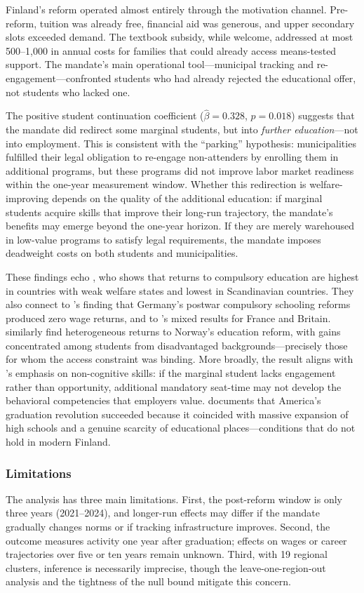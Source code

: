\documentclass[12pt]{article}
\begin{document}
Finland's reform operated almost entirely through the motivation channel. Pre-reform, tuition was already free, financial aid was generous, and upper secondary slots exceeded demand. The textbook subsidy, while welcome, addressed at most \texteuro{}500--1,000 in annual costs for families that could already access means-tested support. The mandate's main operational tool---municipal tracking and re-engagement---confronted students who had already rejected the educational offer, not students who lacked one.

The positive student continuation coefficient ($\hat{\beta} = 0.328$, $p = 0.018$) suggests that the mandate did redirect some marginal students, but into \textit{further education}---not into employment. This is consistent with the ``parking'' hypothesis: municipalities fulfilled their legal obligation to re-engage non-attenders by enrolling them in additional programs, but these programs did not improve labor market readiness within the one-year measurement window. Whether this redirection is welfare-improving depends on the quality of the additional education: if marginal students acquire skills that improve their long-run trajectory, the mandate's benefits may emerge beyond the one-year horizon. If they are merely warehoused in low-value programs to satisfy legal requirements, the mandate imposes deadweight costs on both students and municipalities.

These findings echo \citet{Brunello2009}, who shows that returns to compulsory education are highest in countries with weak welfare states and lowest in Scandinavian countries. They also connect to \citet{Pischke2007}'s finding that Germany's postwar compulsory schooling reforms produced zero wage returns, and to \citet{Grenet2013}'s mixed results for France and Britain. \citet{Aakvik2010} similarly find heterogeneous returns to Norway's education reform, with gains concentrated among students from disadvantaged backgrounds---precisely those for whom the access constraint was binding. More broadly, the result aligns with \citet{Heckman2006}'s emphasis on non-cognitive skills: if the marginal student lacks engagement rather than opportunity, additional mandatory seat-time may not develop the behavioral competencies that employers value. \citet{Goldin1998} documents that America's graduation revolution succeeded because it coincided with massive expansion of high schools and a genuine scarcity of educational places---conditions that do not hold in modern Finland.

\subsubsection*{Limitations} The analysis has three main limitations. First, the post-reform window is only three years (2021--2024), and longer-run effects may differ if the mandate gradually changes norms or if tracking infrastructure improves. Second, the outcome measures activity one year after graduation; effects on wages or career trajectories over five or ten years remain unknown. Third, with 19 regional clusters, inference is necessarily imprecise, though the leave-one-region-out analysis and the tightness of the null bound mitigate this concern.
\end{document}
